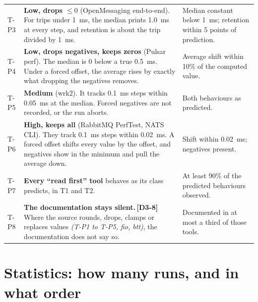 \documentclass[11pt]{article}
\newcommand{\gl}[1]{{\color{soft}\itshape\small (#1)}}
\newcommand{\chgold}[1]{\,{\color{oldcol}\bfseries\footnotesize[#1]}}
\begin{document}
{\begin{longtable}{@{}p{1.0cm} p{9.5cm} p{5.6cm}@{}}
T-P3 & \textbf{Low, drops $\le 0$} (OpenMessaging end-to-end). For trips under 1~ms, the median prints 1.0~ms at every step, and retention is about the trip divided by 1~ms. & Median constant below 1~ms; retention within 5 points of prediction. \\
T-P4 & \textbf{Low, drops negatives, keeps zeros} (Pulsar perf). The median is 0 below a true 0.5~ms. Under a forced offset, the average rises by exactly what dropping the negatives removes. & Average shift within 10\% of the computed value. \\
T-P5 & \textbf{Medium} (wrk2). It tracks 0.1~ms steps within 0.05~ms at the median. Forced negatives are not recorded, or the run aborts. & Both behaviours as predicted. \\
T-P6 & \textbf{High, keeps all} (RabbitMQ PerfTest, NATS CLI). They track 0.1~ms steps within 0.02~ms. A forced offset shifts every value by the offset, and negatives show in the minimum and pull the average down. & Shift within 0.02~ms; negatives present. \\
T-P7 & \textbf{Every ``read first'' tool} behaves as its class predicts, in T1 and T2. & At least 90\% of the predicted behaviours observed. \\
T-P8 & \textbf{The documentation stays silent.}\chgold{D3-8} Where the source rounds, drops, clamps or replaces values \gl{T-P1 to T-P5, fio, btt}, the documentation does not say so. & Documented in at most a third of those tools. \\
\bottomrule
\end{longtable}}

\section{Statistics: how many runs, and in what order}\label{sec:stats}
\end{document}
